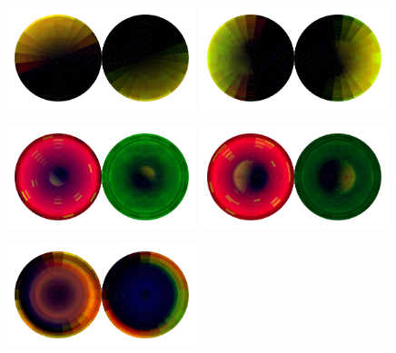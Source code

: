\begin{figure}[h!]
    \begin{center}
        \includegraphics[width=0.49\textwidth]{figures/appendix_featurevis/TU2_20.pdf}
        \includegraphics[width=0.49\textwidth]{figures/appendix_featurevis/TU2_24.pdf}
    \end{center}
    \begin{center}
        \includegraphics[width=0.49\textwidth]{figures/appendix_featurevis/TU2_3.pdf}
        \includegraphics[width=0.49\textwidth]{figures/appendix_featurevis/TU2_21.pdf}
    \end{center}
    \begin{center}
        \includegraphics[width=0.49\textwidth]{figures/appendix_featurevis/TU2_28.pdf}

\end{center}
\end{figure}
